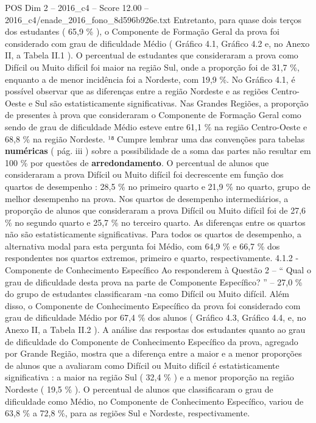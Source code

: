\begin{textsample}{POS Dim 2 – 2016\_c4 – Score 12.00 – 2016\_c4/enade\_2016\_fono\_8d596b926e.txt}
Entretanto, para quase dois terços dos estudantes ( 65,9 \% ), o Componente de Formação Geral da prova foi considerado com grau de dificuldade Médio ( Gráfico 4.1, Gráfico 4.2 e, no Anexo II, a Tabela II.1 ).
O percentual de estudantes que consideraram a prova como Difícil ou Muito difícil foi maior na região Sul, onde a proporção foi de 31,7 \%, enquanto a de menor incidência foi a Nordeste, com 19,9 \%.
No Gráfico 4.1, é possível observar que as diferenças entre a região Nordeste e as regiões Centro-Oeste e Sul são estatisticamente significativas.
Nas Grandes Regiões, a proporção de presentes à prova que consideraram o Componente de Formação Geral como sendo de grau de dificuldade Médio esteve entre 61,1 \% na região Centro-Oeste e 68,8 \% na região Nordeste. ¹⁸ Cumpre lembrar uma das convenções para tabelas \textbf{numéricas} ( pág. iii ) sobre a possibilidade de a soma das partes não resultar em 100 \% por questões de \textbf{arredondamento}.
O percentual de alunos que consideraram a prova Difícil ou Muito difícil foi decrescente em função dos quartos de desempenho : 28,5 \% no primeiro quarto e 21,9 \% no quarto, grupo de melhor desempenho na prova.
Nos quartos de desempenho intermediários, a proporção de alunos que consideraram a prova Difícil ou Muito difícil foi de 27,6 \% no segundo quarto e 25,7 \% no terceiro quarto.
As diferenças entre os quartos não são estatisticamente significativas.
Para todos os quartos de desempenho, a alternativa modal para esta pergunta foi Médio, com 64,9 \% e 66,7 \% dos respondentes nos quartos extremos, primeiro e quarto, respectivamente. 4.1.2 - Componente de Conhecimento Específico Ao responderem à Questão 2 – “ Qual o grau de dificuldade desta prova na parte de Componente Específico? ” – 27,0 \% do grupo de estudantes classificaram -na como Difícil ou Muito difícil.
Além disso, o Componente de Conhecimento Específico da prova foi considerado com grau de dificuldade Médio por 67,4 \% dos alunos ( Gráfico 4.3, Gráfico 4.4, e, no Anexo II, a Tabela II.2 ).
A análise das respostas dos estudantes quanto ao grau de dificuldade do Componente de Conhecimento Específico da prova, agregado por Grande Região, mostra que a diferença entre a maior e a menor proporções de alunos que a avaliaram como Difícil ou Muito difícil é estatisticamente significativa : a maior na região Sul ( 32,4 \% ) e a menor proporção na região Nordeste ( 19,5 \% ).
O percentual de alunos que classificaram o grau de dificuldade como Médio, no Componente de Conhecimento Específico, variou de 63,8 \% a 72,8 \%, para as regiões Sul e Nordeste, respectivamente.

\end{textsample}
